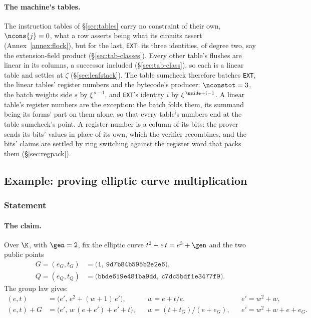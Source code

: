\paragraph{The machine's tables.} The instruction tables of \S\ref{sec:tables} carry no constraint of their own, $\ncons{j}=0$, what a row asserts being what its circuits assert (Annex~\ref{annex:flock}), but for the last, \texttt{EXT}: its three identities, of degree two, say the extension-field product (\S\ref{sec:tab-classes}). Every other table's flushes are linear in its columns, a successor included (\S\ref{sec:tab-class}), so each is a linear table and settles at $\zeta$ (\S\ref{sec:leafstack}). The table sumcheck therefore batches \texttt{EXT}, the linear tables' register numbers and the bytecode's producer: $\nconstot=3$, the batch weights side $s$ by $\xi^{\,s-1}$, and \texttt{EXT}'s identity $i$ by $\xi^{\,\nside+i-1}$. A linear table's register numbers are the exception: the batch folds them, its summand being its forms' part on them alone, so that every table's numbers end at the table sumcheck's point. A register number is a column of its bits: the prover sends its bits' values in place of its own, which the verifier recombines, and the bits' claims are settled by ring switching against the register word that packs them (\S\ref{sec:regpack}).

\subsection{Example: proving elliptic curve multiplication}\label{sec:arith-example}

\subsubsection{Statement}

\paragraph{The claim.} Over $\K$, with $\gen=\mathtt{2}$, fix the elliptic curve $t^{2}+e\,t=e^{3}+\gen$ and the two public points
\begin{align*}
  G=(e_G,t_G)&=\bigl(\mathtt{1},\ \mathtt{9d7b84b595b2e2e6}\bigr),\\
  Q=(e_Q,t_Q)&=\bigl(\mathtt{bbde619e481ba9dd},\ \mathtt{c7dc5bdf1e3477f9}\bigr).
\end{align*}
The group law gives:
\begin{align*}
  [2](e,t)&=\bigl(e',\,e^{2}+(w+1)\,e'\bigr), &&w=e+t/e, &&e'=w^{2}+w,\\
  (e,t)+G&=\bigl(e',\,w\,(e+e')+e'+t\bigr), &&w=(t+t_G)/(e+e_G), &&e'=w^{2}+w+e+e_G .
\end{align*}

